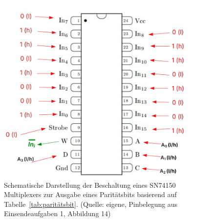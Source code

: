 \begin{figure}
    \centering
    \includegraphics[scale=0.5]{aufgabe 3/img/multiplexer.svg}
    \caption{Schematische Darstellung der Beschaltung eines SN74150 Multiplexers zur Ausgabe eines Paritätsbits basierend auf Tabelle~\ref{tab:paritätsbit}. (Quelle: eigene, Pinbelegung aus Einsendeaufgaben 1, Abbildung 14)}
    \label{fig:multiplexer}
\end{figure}
